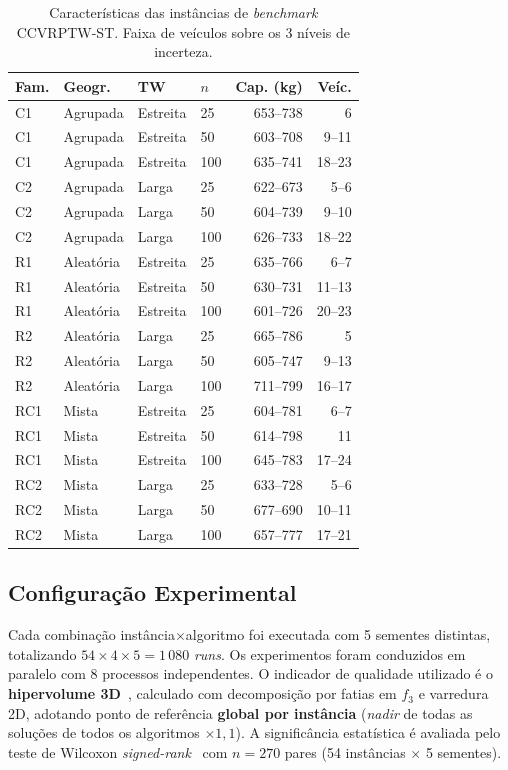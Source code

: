 \documentclass[a4paper,11pt]{article}
\begin{document}
\begin{table}[ht]
\centering
\caption{Características das inst\^ancias de \textit{benchmark} CCVRPTW-ST.
         Faixa de veículos sobre os 3 níveis de incerteza.}
\label{tab:instances}
\small
\begin{tabular}{llllrr}
\toprule
\textbf{Fam.} & \textbf{Geogr.} & \textbf{TW} & $n$ & \textbf{Cap. (kg)} & \textbf{Veíc.} \\
\midrule
C1 & Agrupada  & Estreita & 25  & 653--738 &  6 \\
C1 & Agrupada  & Estreita & 50  & 603--708 &  9--11 \\
C1 & Agrupada  & Estreita & 100 & 635--741 & 18--23 \\
\midrule
C2 & Agrupada  & Larga    & 25  & 622--673 &  5--6 \\
C2 & Agrupada  & Larga    & 50  & 604--739 &  9--10 \\
C2 & Agrupada  & Larga    & 100 & 626--733 & 18--22 \\
\midrule
R1 & Aleatória & Estreita & 25  & 635--766 &  6--7 \\
R1 & Aleatória & Estreita & 50  & 630--731 & 11--13 \\
R1 & Aleatória & Estreita & 100 & 601--726 & 20--23 \\
\midrule
R2 & Aleatória & Larga    & 25  & 665--786 &  5 \\
R2 & Aleatória & Larga    & 50  & 605--747 &  9--13 \\
R2 & Aleatória & Larga    & 100 & 711--799 & 16--17 \\
\midrule
RC1 & Mista    & Estreita & 25  & 604--781 &  6--7 \\
RC1 & Mista    & Estreita & 50  & 614--798 & 11 \\
RC1 & Mista    & Estreita & 100 & 645--783 & 17--24 \\
\midrule
RC2 & Mista    & Larga    & 25  & 633--728 &  5--6 \\
RC2 & Mista    & Larga    & 50  & 677--690 & 10--11 \\
RC2 & Mista    & Larga    & 100 & 657--777 & 17--21 \\
\bottomrule
\end{tabular}
\end{table}

\subsection{Configuração Experimental}

Cada combinação inst\^ancia$\times$algoritmo foi executada com 5 sementes
distintas, totalizando $54 \times 4 \times 5 = 1\,080$ \textit{runs}.
Os experimentos foram conduzidos em paralelo com 8 processos independentes.
O indicador de qualidade utilizado é o \textbf{hipervolume 3D}~\citep{zitzler:1998},
calculado com decomposição por fatias em $f_3$ e varredura 2D,
adotando ponto de refer\^encia \textbf{global por inst\^ancia}
(\textit{nadir} de todas as soluções de todos os algoritmos $\times 1{,}1$).
A signific\^ancia estatística é avaliada pelo teste de Wilcoxon
\textit{signed-rank}~\citep{demsar:2006} com $n = 270$ pares
(54 inst\^ancias $\times$ 5 sementes).
\end{document}
